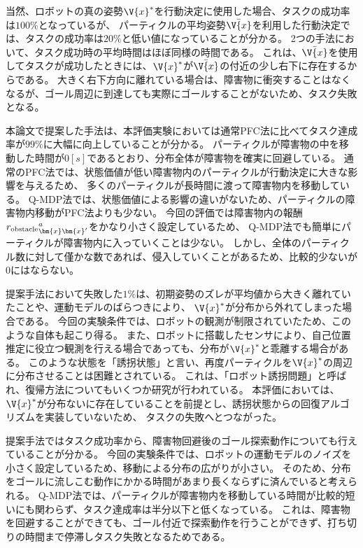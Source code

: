 当然、ロボットの真の姿勢$\V{x}^{*}$を行動決定に使用した場合、タスクの成功率は$100\%$となっているが、
パーティクルの平均姿勢$\bar{\V{x}}$を利用した行動決定では、タスクの成功率は$20\%$と低い値になっていることが分かる。
2つの手法において、タスク成功時の平均時間はほぼ同様の時間である。
これは、$\bar{\V{x}}$を使用してタスクが成功したときには、$\V{x}^{*}$が$\bar{\V{x}}$の付近の少し右下に存在するからである。
大きく右下方向に離れている場合は、障害物に衝突することはなくなるが、ゴール周辺に到達しても実際にゴールすることがないため、タスク失敗となる。

本論文で提案した手法は、本評価実験においては通常PFC法に比べてタスク達成率が$99\%$に大幅に向上していることが分かる。
パーティクルが障害物の中を移動した時間が$0[\si{s}]$であるとおり、分布全体が障害物を確実に回避している。
通常のPFC法では、状態価値が低い障害物内のパーティクルが行動決定に大きな影響を与えるため、
多くのパーティクルが長時間に渡って障害物内を移動している。
Q-MDP法では、状態価値による影響の違いがないため、パーティクルの障害物内移動がPFC法よりも少ない。
今回の評価では障害物内の報酬${r_{\rm obstacle}}^{a}_{\bm{x}\bm{x}^{\prime}}$をかなり小さく設定しているため、
Q-MDP法でも簡単にパーティクルが障害物内に入っていくことは少ない。
しかし、全体のパーティクル数に対して僅かな数であれば、侵入していくことがあるため、比較的少ないが$0$にはならない。

提案手法において失敗した$1\%$は、初期姿勢のズレが平均値から大きく離れていたことや、運動モデルのばらつきにより、
$\V{x}^{*}$が分布から外れてしまった場合である。
今回の実験条件では、ロボットの観測が制限されていたため、このような自体も起こり得る。
また、ロボットに搭載したセンサにより、自己位置推定に役立つ観測を行える場合であっても、分布が$\V{x}^{*}$と乖離する場合がある。
このような状態を「誘拐状態」と言い、再度パーティクルを$\V{x}^{*}$の周辺に分布させることは困難とされている。
これは、「ロボット誘拐問題」と呼ばれ、復帰方法についてもいくつか研究が行われている\cite{lenser2000etal, aa}。
本評価においては、$\V{x}^{*}$が分布ないに存在していることを前提とし、誘拐状態からの回復アルゴリズムを実装していないため、
タスクの失敗へとつながった。

提案手法ではタスク成功率から、障害物回避後のゴール探索動作についても行えていることが分かる。
今回の実験条件では、ロボットの運動モデルのノイズを小さく設定しているため、移動による分布の広がりが小さい。
そのため、分布をゴールに流しこむ動作にかかる時間があまり長くならずに済んでいると考えられる。
Q-MDP法では、パーティクルが障害物内を移動している時間が比較的短いにも関わらず、タスク達成率は半分以下と低くなっている。
これは、障害物を回避することができても、ゴール付近で探索動作を行うことができず、打ち切りの時間まで停滞しタスク失敗となるためである。

